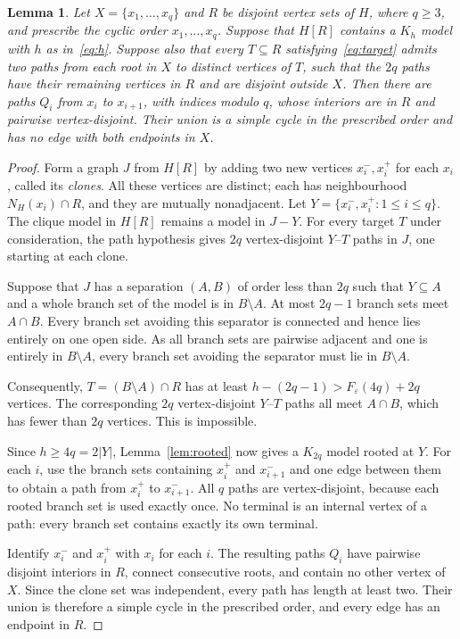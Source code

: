 \documentclass[10pt,letterpaper]{article}
\newtheorem{lemma}[theorem]{Lemma}
\theoremstyle{definition}
\theoremstyle{remark}
\newcommand{\eps}{\varepsilon}
\begin{document}
\begin{lemma}\label{lem:orderedfromfans}
Let $X=\{x_1,\ldots,x_q\}$ and $R$ be disjoint vertex sets of $H$, where $q\ge3$, and prescribe the cyclic order $x_1,\ldots,x_q$. Suppose that $H[R]$ contains a $K_h$ model with $h$ as in~\eqref{eq:h}. Suppose also that every $T\subseteq R$ satisfying~\eqref{eq:target} admits two paths from each root in $X$ to distinct vertices of $T$, such that the $2q$ paths have their remaining vertices in $R$ and are disjoint outside $X$. Then there are paths $Q_i$ from $x_i$ to $x_{i+1}$, with indices modulo $q$, whose interiors are in $R$ and pairwise vertex-disjoint. Their union is a simple cycle in the prescribed order and has no edge with both endpoints in $X$.
\end{lemma}
\begin{proof}
Form a graph $J$ from $H[R]$ by adding two new vertices $x_i^-,x_i^+$ for each $x_i$, called its \emph{clones}. All these vertices are distinct; each has neighbourhood $N_H(x_i)\cap R$, and they are mutually nonadjacent. Let $Y=\{x_i^-,x_i^+:1\le i\le q\}$. The clique model in $H[R]$ remains a model in $J-Y$. For every target $T$ under consideration, the path hypothesis gives $2q$ vertex-disjoint $Y$--$T$ paths in $J$, one starting at each clone.

Suppose that $J$ has a separation $(A,B)$ of order less than $2q$ such that $Y\subseteq A$ and a whole branch set of the model is in $B\setminus A$. At most $2q-1$ branch sets meet $A\cap B$. Every branch set avoiding this separator is connected and hence lies entirely on one open side. As all branch sets are pairwise adjacent and one is entirely in $B\setminus A$, every branch set avoiding the separator must lie in $B\setminus A$.

Consequently, $T=(B\setminus A)\cap R$ has at least $h-(2q-1)>F_\eps(4q)+2q$ vertices. The corresponding $2q$ vertex-disjoint $Y$--$T$ paths all meet $A\cap B$, which has fewer than $2q$ vertices. This is impossible.

Since $h\ge4q=2|Y|$, Lemma~\ref{lem:rooted} now gives a $K_{2q}$ model rooted at $Y$. For each $i$, use the branch sets containing $x_i^+$ and $x_{i+1}^-$ and one edge between them to obtain a path from $x_i^+$ to $x_{i+1}^-$. All $q$ paths are vertex-disjoint, because each rooted branch set is used exactly once. No terminal is an internal vertex of a path: every branch set contains exactly its own terminal.

Identify $x_i^-$ and $x_i^+$ with $x_i$ for each $i$. The resulting paths $Q_i$ have pairwise disjoint interiors in $R$, connect consecutive roots, and contain no other vertex of $X$. Since the clone set was independent, every path has length at least two. Their union is therefore a simple cycle in the prescribed order, and every edge has an endpoint in $R$.
\end{proof}
\end{document}
